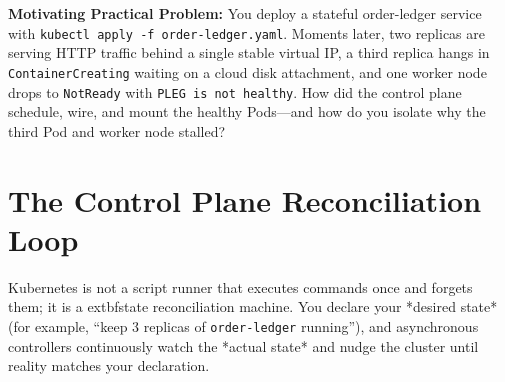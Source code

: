 \begin{chaptergoalsbox}
\textbf{Motivating Practical Problem:}
You deploy a stateful order-ledger service with \texttt{kubectl apply -f order-ledger.yaml}. Moments later, two replicas are serving HTTP traffic behind a single stable virtual IP, a third replica hangs in \texttt{ContainerCreating} waiting on a cloud disk attachment, and one worker node drops to \texttt{NotReady} with \texttt{PLEG is not healthy}. How did the control plane schedule, wire, and mount the healthy Pods—and how do you isolate why the third Pod and worker node stalled?
\end{chaptergoalsbox}

\section{The Control Plane Reconciliation Loop}

Kubernetes is not a script runner that executes commands once and forgets them; it is a 	extbf{state reconciliation machine}. You declare your *desired state* (for example, ``keep 3 replicas of \texttt{order-ledger} running''), and asynchronous controllers continuously watch the *actual state* and nudge the cluster until reality matches your declaration.

